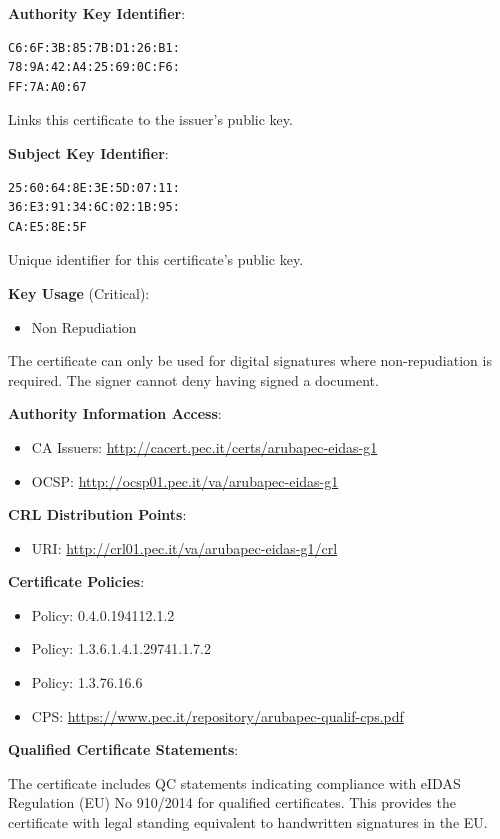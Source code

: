 \documentclass[12pt,a4paper]{article}
\begin{document}
\textbf{Authority Key Identifier}:
\begin{verbatim}
C6:6F:3B:85:7B:D1:26:B1:
78:9A:42:A4:25:69:0C:F6:
FF:7A:A0:67
\end{verbatim}

Links this certificate to the issuer's public key.

\textbf{Subject Key Identifier}:
\begin{verbatim}
25:60:64:8E:3E:5D:07:11:
36:E3:91:34:6C:02:1B:95:
CA:E5:8E:5F
\end{verbatim}

Unique identifier for this certificate's public key.

\textbf{Key Usage} (Critical):
\begin{itemize}
    \item Non Repudiation
\end{itemize}

The certificate can only be used for digital signatures where non-repudiation is required. The signer cannot deny having signed a document.

\textbf{Authority Information Access}:
\begin{itemize}
    \item CA Issuers: \url{http://cacert.pec.it/certs/arubapec-eidas-g1}
    \item OCSP: \url{http://ocsp01.pec.it/va/arubapec-eidas-g1}
\end{itemize}

\textbf{CRL Distribution Points}:
\begin{itemize}
    \item URI: \url{http://crl01.pec.it/va/arubapec-eidas-g1/crl}
\end{itemize}

\textbf{Certificate Policies}:
\begin{itemize}
    \item Policy: 0.4.0.194112.1.2
    \item Policy: 1.3.6.1.4.1.29741.1.7.2
    \item Policy: 1.3.76.16.6
    \item CPS: \url{https://www.pec.it/repository/arubapec-qualif-cps.pdf}
\end{itemize}

\textbf{Qualified Certificate Statements}:

The certificate includes QC statements indicating compliance with eIDAS Regulation (EU) No 910/2014 for qualified certificates. This provides the certificate with legal standing equivalent to handwritten signatures in the EU.
\end{document}
